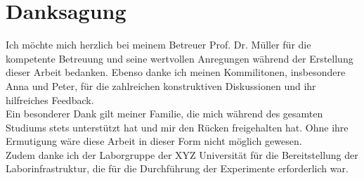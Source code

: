\chapter*{Danksagung}
Ich möchte mich herzlich bei meinem Betreuer Prof. Dr. Müller für die kompetente Betreuung und seine wertvollen Anregungen während der Erstellung dieser Arbeit bedanken. Ebenso danke ich meinen Kommilitonen, insbesondere Anna und Peter, für die zahlreichen konstruktiven Diskussionen und ihr hilfreiches Feedback. \\
Ein besonderer Dank gilt meiner Familie, die mich während des gesamten Studiums stets unterstützt hat und mir den Rücken freigehalten hat. Ohne ihre Ermutigung wäre diese Arbeit in dieser Form nicht möglich gewesen. \\
Zudem danke ich der Laborgruppe der XYZ Universität für die Bereitstellung der Laborinfrastruktur, die für die Durchführung der Experimente erforderlich war. \\
\newpage
